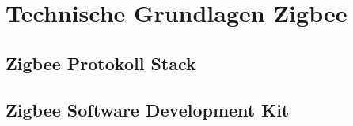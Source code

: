 \clearpage
\section{Technische Grundlagen Zigbee}\label{sec:TechnischeGrundlagenZigbee}

\subsection{Zigbee Protokoll Stack}\label{sec:ZigbeeProtokollStack}

\subsection{Zigbee Software Development Kit}\label{sec:ZigbeeSoftwareDevelopmentKit}
